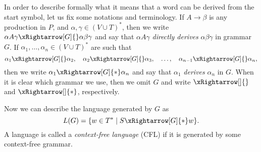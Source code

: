 

\setcounter{section}{5}
\setcounter{subsection}{1}
\setcounter{dfn}{3}


In order to describe formally what it means that a word can be derived from the start symbol, let us fix some notations and terminology.
If $A \to \beta$ is any production in $P$, and $\alpha, \gamma \in (V \cup T)^*$,
then we write $\alpha A \gamma \xRightarrow[G]{} \alpha \beta \gamma$
and say that $\alpha A \gamma$ \emph{directly derives} $\alpha\beta\gamma$ in grammar~$G$.
If $\alpha_1, \ldots, \alpha_n \in (V \cup T)^*$ are such that
\[
\alpha_1 \xRightarrow[G]{} \alpha_2, \quad \alpha_2 \xRightarrow[G]{} \alpha_3, \quad \ldots, \quad  \alpha_{n-1} \xRightarrow[G]{} \alpha_n,
\]
then we write $\alpha_1 \xRightarrow[G]{*} \alpha_n$ and say that $\alpha_1$ \emph{derives} $\alpha_n$ in $G$.
When it is clear which grammar we use, then we omit $G$ and write $\xRightarrow[]{}$ and $\xRightarrow[]{*}$, respectively.

Now we can describe the language generated by $G$ as
\[
L(G) = \{w \in T^* \mid S \xRightarrow[G]{*} w\}.
\]
A language is called a \emph{context-free language} (CFL) if it is generated by some context-free grammar.



